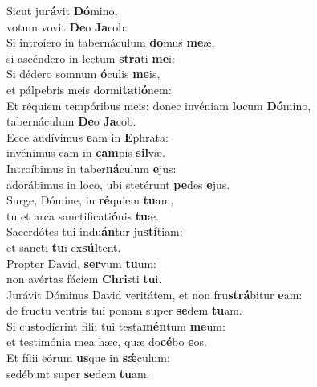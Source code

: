 \evenverse Sicut ju\textbf{rá}vit \textbf{Dó}mino,~\*\\
\evenverse votum vovit \textbf{De}o \textbf{Ja}cob:\\
\oddverse Si introíero in tabernáculum \textbf{do}mus \textbf{me}æ,~\*\\
\oddverse si ascéndero in lectum \textbf{stra}ti \textbf{me}i:\\
\evenverse Si dédero somnum \textbf{ó}culis \textbf{me}is,~\*\\
\evenverse et pálpebris meis dormi\textbf{ta}ti\textbf{ó}nem:\\
\oddverse Et réquiem tempóribus meis: donec invéniam \textbf{lo}cum \textbf{Dó}mino,~\*\\
\oddverse tabernáculum \textbf{De}o \textbf{Ja}cob.\\
\evenverse Ecce audívimus \textbf{e}am in \textbf{E}phrata:~\*\\
\evenverse invénimus eam in \textbf{cam}pis \textbf{sil}væ.\\
\oddverse Introíbimus in taber\textbf{ná}culum \textbf{e}jus:~\*\\
\oddverse adorábimus in loco, ubi stetérunt \textbf{pe}des \textbf{e}jus.\\
\evenverse Surge, Dómine, in \textbf{ré}quiem \textbf{tu}am,~\*\\
\evenverse tu et arca sanctificati\textbf{ó}nis \textbf{tu}æ.\\
\oddverse Sacerdótes tui indu\textbf{án}tur ju\textbf{stí}tiam:~\*\\
\oddverse et sancti \textbf{tu}i ex\textbf{súl}tent.\\
\evenverse Propter David, \textbf{ser}vum \textbf{tu}um:~\*\\
\evenverse non avértas fáciem \textbf{Chri}sti \textbf{tu}i.\\
\oddverse Jurávit Dóminus David veritátem, et non fru\textbf{strá}bitur \textbf{e}am:~\*\\
\oddverse de fructu ventris tui ponam super \textbf{se}dem \textbf{tu}am.\\
\evenverse Si custodíerint fílii tui testa\textbf{mén}tum \textbf{me}um:~\*\\
\evenverse et testimónia mea hæc, quæ do\textbf{cé}bo \textbf{e}os.\\
\oddverse Et fílii eórum \textbf{us}que in \textbf{sǽ}culum:~\*\\
\oddverse sedébunt super \textbf{se}dem \textbf{tu}am.\\
